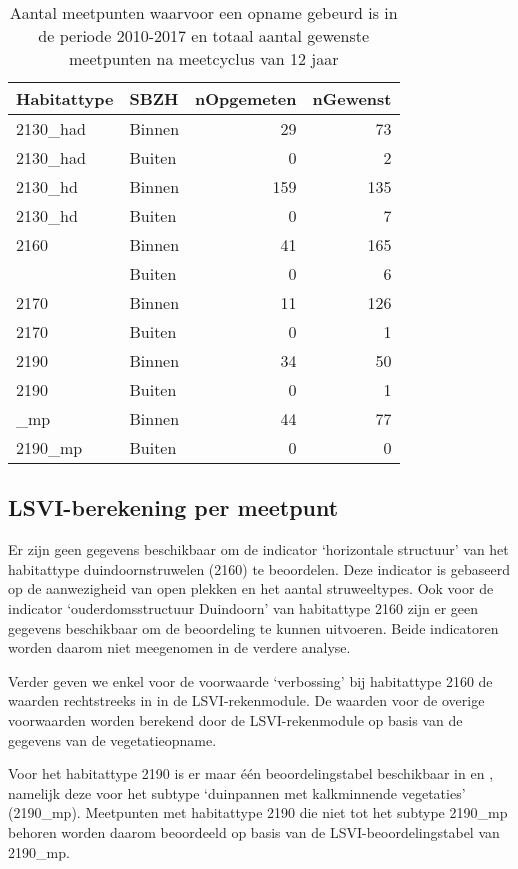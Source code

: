 \documentclass[twoside]{extreport}
\begin{document}
\begin{table}[!h]

\caption{\label{tab:PINKtabAantallenToestand}Aantal meetpunten waarvoor een opname gebeurd is in de periode 2010-2017 en totaal aantal gewenste meetpunten na meetcyclus van 12 jaar}
\centering
\begin{tabular}{llrr}
\toprule
Habitattype & SBZH & nOpgemeten & nGewenst\\
\midrule
2130\_had & Binnen & 29 & 73\\
2130\_had & Buiten & 0 & 2\\
2130\_hd & Binnen & 159 & 135\\
2130\_hd & Buiten & 0 & 7\\
2160 & Binnen & 41 & 165\\
\addlinespace
2160 & Buiten & 0 & 6\\
2170 & Binnen & 11 & 126\\
2170 & Buiten & 0 & 1\\
2190 & Binnen & 34 & 50\\
2190 & Buiten & 0 & 1\\
\addlinespace
2190\_mp & Binnen & 44 & 77\\
2190\_mp & Buiten & 0 & 0\\
\bottomrule
\end{tabular}
\end{table}

\subsection{LSVI-berekening per
meetpunt}\label{lsvi-berekening-per-meetpunt-3}

Er zijn geen gegevens beschikbaar om de indicator `horizontale
structuur' van het habitattype duindoornstruwelen (2160) te beoordelen.
Deze indicator is gebaseerd op de aanwezigheid van open plekken en het
aantal struweeltypes. Ook voor de indicator `ouderdomsstructuur
Duindoorn' van habitattype 2160 zijn er geen gegevens beschikbaar om de
beoordeling te kunnen uitvoeren. Beide indicatoren worden daarom niet
meegenomen in de verdere analyse.

Verder geven we enkel voor de voorwaarde `verbossing' bij habitattype
2160 de waarden rechtstreeks in in de LSVI-rekenmodule. De waarden voor
de overige voorwaarden worden berekend door de LSVI-rekenmodule op basis
van de gegevens van de vegetatieopname.

Voor het habitattype 2190 is er maar één beoordelingstabel beschikbaar
in \citet{TJollyn2009} en \citet{Oosterlynck2018}, namelijk deze voor
het subtype `duinpannen met kalkminnende vegetaties' (2190\_mp).
Meetpunten met habitattype 2190 die niet tot het subtype 2190\_mp
behoren worden daarom beoordeeld op basis van de LSVI-beoordelingstabel
van 2190\_mp.
\end{document}

